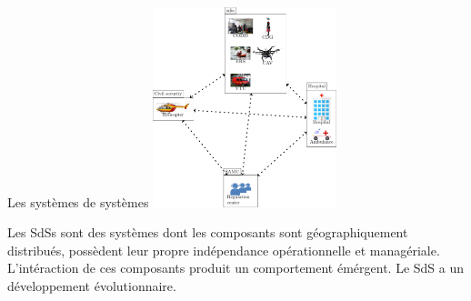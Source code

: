 

\begin{frame}{Les systèmes de systèmes}
\centering 
\includegraphics[width=0.4\textwidth, height=0.3\textwidth]{imgs/fig_sos_overview.pdf}
\begin{definition}
 Les SdSs sont des systèmes dont les composants sont géographiquement
distribués, possèdent leur propre indépendance opérationnelle et
managériale. 
L'intéraction de ces composants produit un comportement émérgent. Le
SdS a un développement évolutionnaire. 
\end{definition}
\end{frame}

